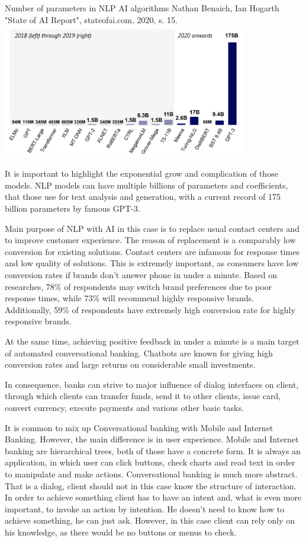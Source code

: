 \mtfigure
{Number of parameters in NLP AI algorithms}
{Nathan Benaich, Ian Hogarth "State of AI Report", stateofai.com, 2020, s. 15.}
{
    \includegraphics[width=0.8\textwidth,keepaspectratio]{images/nlp_models_parameters.png}
}

It is important to highlight the exponential grow and complication of those models. 
NLP models can have multiple billions of parameters and coefficients, that those use for text analysis and generation, with a current record of 175 billion parameters by famous GPT-3.

Main purpose of NLP with AI in this case is to replace usual contact centers and to improve customer experience.
The reason of replacement is a comparably low conversion for existing solutions.
Contact centers are infamous for response times and low quality of solutions.
This is extremely important, as consumers have low conversion rates if brands don't answer phone in under a minute.
Based on researches, 78\% of respondents may switch brand preferences due to poor response times, while 73\% will recommend highly responsive brands.
Additionally, 59\% of respondents have extremely high conversion rate for highly responsive brands.
\cite{lfbyphone_consumer_analytics}

At the same time, achieving positive feedback in under a minute is a main target of automated conversational banking.
Chatbots are known for giving high conversion rates and large returns on considerable small investments.
\cite{accenture_ai_banking}

In consequence, banks can strive to major influence of dialog interfaces on client, through which clients can transfer funds, send it to other clients, issue card, convert currency, execute payments and various other basic tasks.

It is common to mix up Conversational banking with Mobile and Internet Banking.
However, the main difference is in user experience.
Mobile and Internet banking are hierarchical trees, both of those have a concrete form.
It is always an application, in which user can click buttons, check charts and read text in order to manipulate and make actions.
Conversational banking is much more abstract.
That is a dialog, client should not in this case know the structure of interaction.
In order to achieve something client has to have an intent and, what is even more important, to invoke an action by intention.
He doesn't need to know how to achieve something, he can just ask.
However, in this case client can rely only on his knowledge, as there would be no buttons or menus to check.


